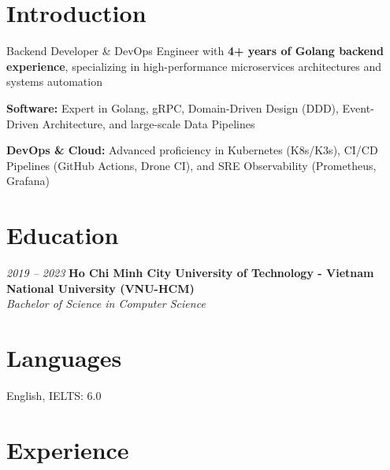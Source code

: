 \section{Introduction}
\begin{onecolentry}
    \begin{highlights}
        \item Backend Developer \& DevOps Engineer with \textbf{4+ years of Golang backend experience}, specializing in high-performance microservices architectures and systems automation
        \item \textbf{Software:} Expert in Golang, gRPC, Domain-Driven Design (DDD), Event-Driven Architecture, and large-scale Data Pipelines
        \item \textbf{DevOps \& Cloud:} Advanced proficiency in Kubernetes (K8s/K3s), CI/CD Pipelines (GitHub Actions, Drone CI), and SRE Observability (Prometheus, Grafana)
    \end{highlights}
\end{onecolentry}

\section{Education}
\begin{twocolentry}{\textit{2019 -- 2023}}
    \textbf{Ho Chi Minh City University of Technology - Vietnam National University (VNU-HCM)}\\[4pt]
    \textit{Bachelor of Science in Computer Science}
\end{twocolentry}

\section{Languages}
\begin{onecolentry}
    \begin{highlights}
        \item English, IELTS: 6.0
    \end{highlights}
\end{onecolentry}

\section{Experience}

